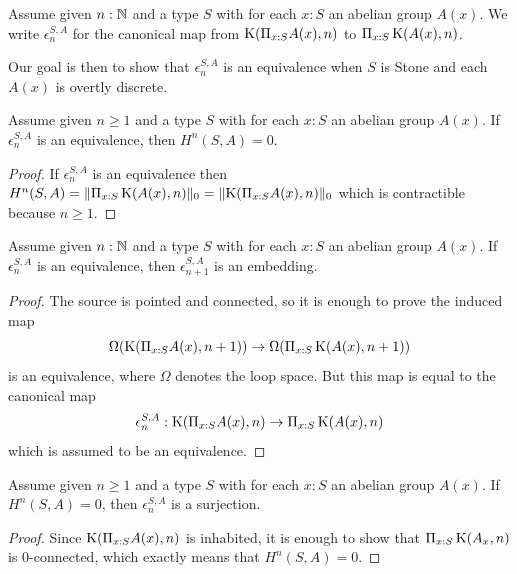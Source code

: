 \begin{definition}
  Assume given $n:\mathbb{N}$ and a type $S$ with for each $x:S$ an abelian group $A(x)$. We write $\epsilon_n^{S,A}$ for the canonical map from ${\mathrm{K}}(\Pi_{x:S}A(x),n)$ to $\Pi_{x:S}\,{\mathrm{K}}(A(x),n)$.
\end{definition}

Our goal is then to show that $\epsilon_n^{S,A}$ is an equivalence when $S$ is Stone and each $A(x)$ is overtly discrete. 

\begin{lemma}\label{ev-eq-acyclic}
  Assume given $n\geq 1$ and a type $S$ with for each $x:S$ an abelian group $A(x)$. If $\epsilon_n^{S,A}$ is an equivalence, then $H^n(S,A) = 0$. 
\end{lemma}

\begin{proof}
  If $\epsilon_n^{S,A}$ is an equivalence then
  $H^n(S,A) = \lVert \Pi_{x : S}\, {\mathrm{K}}(A(x),n) \rVert_0 = \lVert {\mathrm{K}}(\Pi_{x : S} A(x) , n) \rVert_0$
  which is contractible because $n\geq 1$. 
\end{proof}

\begin{lemma}\label{ev-embedding}
  Assume given $n:\mathbb{N}$ and a type $S$ with for each $x:S$ an abelian group $A(x)$. If $\epsilon_n^{S,A}$ is an equivalence, then $\epsilon_{n+1}^{S,A}$ is an embedding. 
\end{lemma}

\begin{proof}
  The source is pointed and connected, so it is enough to prove the induced map
  \[\Omega({\mathrm{K}}(\Pi_{x:S}A(x),n+1)) \to \Omega(\Pi_{x:S}\, {\mathrm{K}}(A(x),n+1))\]
  is an equivalence, where $\Omega$ denotes the loop space. But this map is equal to the canonical map
  \[\epsilon_n^{S,A} : {\mathrm{K}}(\Pi_{x:S}A(x),n) \to \Pi_{x:S}\,{\mathrm{K}}(A(x),n)\]
  which is assumed to be an equivalence.
\end{proof} 

\begin{lemma}\label{acyclic-ev-surjective}
  Assume given $n\geq 1$ and a type $S$ with for each $x:S$ an abelian group $A(x)$. If $H^n(S,A) = 0$, then $\epsilon_{n}^{S,A}$ is a surjection.
\end{lemma}

\begin{proof}
  Since ${\mathrm{K}}(\Pi_{x:S}A(x),n)$ is inhabited, it is enough to show that $\Pi_{x : S}\, {\mathrm{K}}(A_x,n)$ is $0$-connected, 
  which exactly means that $H^{n}(S,A)=0$. 
\end{proof} 

